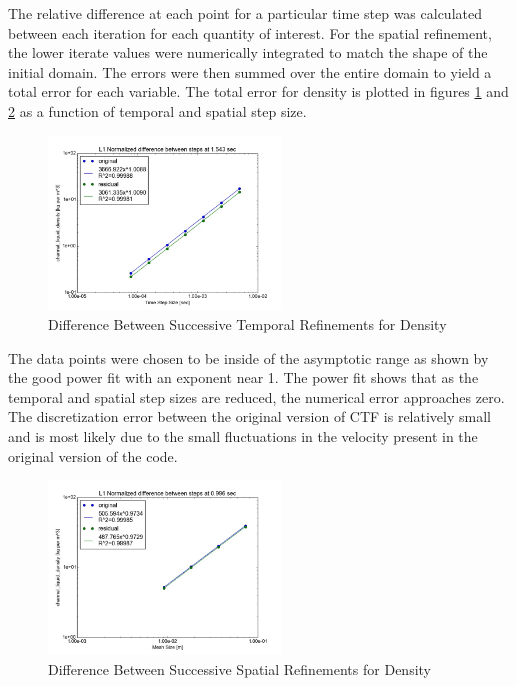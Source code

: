 \documentclass{mc2015}
\begin{document}
The relative difference at each point for a particular time step was calculated
between each iteration for each quantity of interest. For the spatial
refinement, the lower iterate values were numerically integrated to match the
shape of the initial domain. The errors were then summed over the entire domain
to yield a total error for each variable. The total error for density is
plotted in figures \ref{fig:Temporal:Diff_rho} and \ref{fig:Spatial:Diff_rho} as
a function of temporal and spatial step size. 

\begin{figure}[!h]
	\centering
	\includegraphics[width=0.55\textwidth]{images/Temporal_Study/Difference_rho}
	\caption{Difference Between Successive Temporal Refinements for Density}
	\label{fig:Temporal:Diff_rho}
\end{figure} 

The data points were chosen to be inside of the asymptotic range as shown by
the good power fit with an exponent near 1. The power fit shows that as the
temporal and spatial step sizes are reduced, the numerical error approaches
zero. The discretization error between the original version of CTF is
relatively small and is most likely due to the small fluctuations in the
velocity present in the original version of the code. 

\begin{figure}[!h]
	\centering
	\includegraphics[width=0.55\textwidth]{images/Spatial_Study/Difference_rho}
	\caption{Difference Between Successive Spatial Refinements for Density}
	\label{fig:Spatial:Diff_rho}
\end{figure} 
\end{document}
